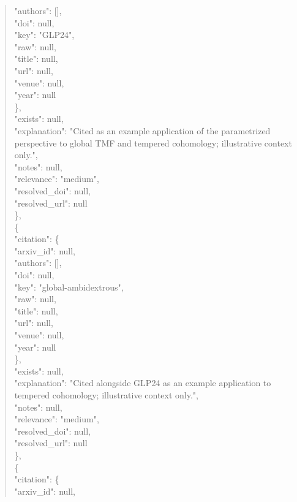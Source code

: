 \documentclass[11pt]{article}
\begin{document}
\begin{quote}
        "authors": [],\\
        "doi": null,\\
        "key": "GLP24",\\
        "raw": null,\\
        "title": null,\\
        "url": null,\\
        "venue": null,\\
        "year": null\\
      \},\\
      "exists": null,\\
      "explanation": "Cited as an example application of the parametrized perspective to global TMF and tempered cohomology; illustrative context only.",\\
      "notes": null,\\
      "relevance": "medium",\\
      "resolved\_doi": null,\\
      "resolved\_url": null\\
    \},\\
    \{\\
      "citation": \{\\
        "arxiv\_id": null,\\
        "authors": [],\\
        "doi": null,\\
        "key": "global-ambidextrous",\\
        "raw": null,\\
        "title": null,\\
        "url": null,\\
        "venue": null,\\
        "year": null\\
      \},\\
      "exists": null,\\
      "explanation": "Cited alongside GLP24 as an example application to tempered cohomology; illustrative context only.",\\
      "notes": null,\\
      "relevance": "medium",\\
      "resolved\_doi": null,\\
      "resolved\_url": null\\
    \},\\
    \{\\
      "citation": \{\\
        "arxiv\_id": null,\\

\end{quote}
\end{document}
